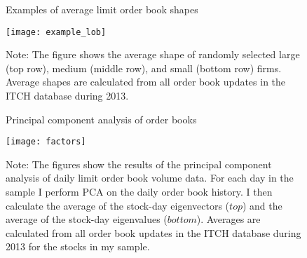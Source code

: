 \begin{figure}[p]
\linespread{1}
\centering
\captionsetup{labelsep=colon, font=footnotesize, justification=centerfirst, width=\linewidth}
\caption{Examples of average limit order book shapes}
\label{fig:examples}
\texttt{[image: example\_lob]}
\captionsetup{font=footnotesize, justification=justified, width=\linewidth}
\caption*{Note: The figure shows the average shape of randomly selected large (top row), medium (middle row), and small (bottom row) firms. Average shapes are calculated from all order book updates in the ITCH database during 2013.}
\end{figure}


\begin{figure}[p]
\linespread{1}
\centering
\captionsetup{labelsep=colon, font=footnotesize, justification=centerfirst, width=\linewidth}
\caption{Principal component analysis of order books}
\label{fig:pca}
\texttt{[image: factors]}
\captionsetup{font=footnotesize, justification=justified, width=\linewidth}
\caption*{Note: The figures show the results of the principal component analysis of daily limit order book volume data. For each day in the sample I perform PCA on the daily order book history. I then calculate the average of the stock-day eigenvectors ($top$) and the average of the stock-day eigenvalues ($bottom$). Averages are calculated from all order book updates in the ITCH database during 2013 for the stocks in my sample.}
\end{figure}

